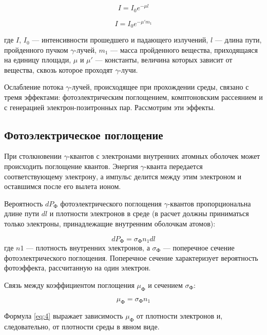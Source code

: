 \documentclass[a4paper,12pt]{article}
\begin{document}
\begin{equation}\label{eq:1}
    I = I_0 e^{- \mu l}
\end{equation}

\begin{equation}\label{eq:2}
    I = I_0 e^{- \mu' m_1}
\end{equation}

где $I$, $I_0$ — интенсивности прошедшего и падающего излучений, $l$ — длина пути, пройденного пучком $\gamma$-лучей, $m_1$ — масса пройденного вещества, приходящаяся на единицу площади, $\mu$ и $\mu'$ — константы, величина которых зависит от вещества, сквозь которое проходят $\gamma$-лучи.

Ослабление потока $\gamma$-лучей, происходящее при прохождении среды, связано с тремя эффектами: фотоэлектрическим поглощением, комптоновским рассеянием и с генерацией электрон-позитронных пар. Рассмотрим эти эффекты.

\subsection*{Фотоэлектрическое поглощение}

При столкновении $\gamma$-квантов с электронами внутренних атомных оболочек может происходить поглощение квантов. Энергия $\gamma$-кванта передается соответствующему электрону, а импульс делится между этим электроном и оставшимся после его вылета ионом.

Вероятность $dP_\text{Ф}$ фотоэлектрического поглощения $\gamma$-квантов пропорциональна длине пути $dl$ и плотности электронов в среде (в расчет должны приниматься только электроны, принадлежащие внутренним оболочкам атомов):

\begin{equation}\label{eq:3}
    dP_\text{Ф} = \sigma_\text{Ф} n_1 dl
\end{equation}
где $n1$ — плотность внутренних электронов, а $\sigma_\text{Ф}$ — поперечное сечение фотоэлектрического поглощения. Поперечное сечение характеризует вероятность фотоэффекта, рассчитанную на один электрон.

Связь между коэффициентом поглощения $\mu_\text{Ф}$ и сечением $\sigma_\text{Ф}$:

\begin{equation}\label{eq:4}
    \mu_\text{Ф} = \sigma_\text{Ф}n_1
\end{equation}

Формула \eqref{eq:4} выражает зависимость $\mu_\text{Ф}$ от плотности электронов и, следовательно, от плотности среды в явном виде.
\end{document}
